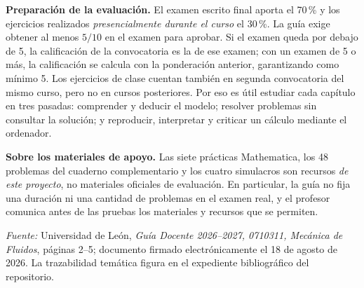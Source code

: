 \noindent\textbf{Preparación de la evaluación.}
El examen escrito final aporta el 70\,\% y los ejercicios realizados
\emph{presencialmente durante el curso} el 30\,\%.
La guía exige obtener al menos \(5/10\) en el examen para aprobar.
Si el examen queda por debajo de 5, la calificación de la convocatoria
es la de ese examen; con un examen de 5 o más, la calificación se
calcula con la ponderación anterior, garantizando como mínimo 5.
Los ejercicios de clase cuentan también en segunda convocatoria del
mismo curso, pero no en cursos posteriores. Por eso es útil estudiar
cada capítulo en tres pasadas: comprender y deducir el modelo;
resolver problemas sin consultar la solución; y reproducir,
interpretar y criticar un cálculo mediante el ordenador.

\noindent\textbf{Sobre los materiales de apoyo.}
Las siete prácticas Mathematica, los 48 problemas del cuaderno
complementario y los cuatro simulacros son recursos
\emph{de este proyecto}, no materiales oficiales de evaluación.
En particular, la guía no fija una duración ni una cantidad de
problemas en el examen real, y el profesor comunica antes de las pruebas
los materiales y recursos que se permiten.

\noindent\textit{Fuente:} Universidad de León, \emph{Guía Docente
2026--2027, 0710311, Mecánica de Fluidos}, páginas 2--5; documento
firmado electrónicamente el 18 de agosto de 2026.
La trazabilidad temática figura en el expediente bibliográfico del repositorio.
